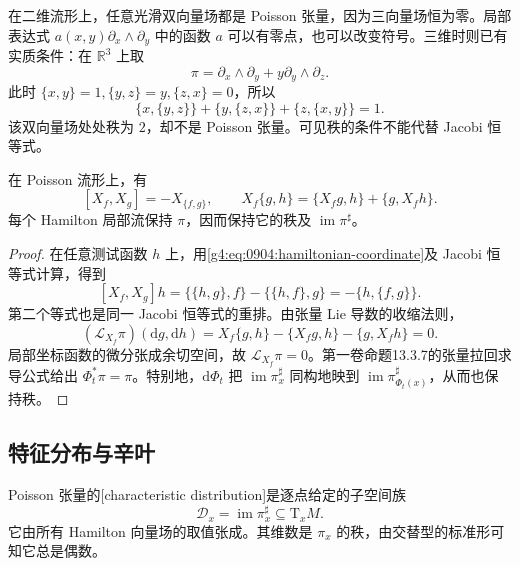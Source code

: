 \begin{example}\label{g4:exm:0904:jacobi-tests}
	在二维流形上，任意光滑双向量场都是 Poisson 张量，因为三向量场恒为零。局部表达式 \(a(x,y)\partial_x\wedge\partial_y\) 中的函数 \(a\) 可以有零点，也可以改变符号。三维时则已有实质条件：在 \(\mathbb R^3\) 上取
	\[
		\pi=\partial_x\wedge\partial_y+y\partial_y\wedge\partial_z.
	\]
	此时 \(\{x,y\}=1,\{y,z\}=y,\{z,x\}=0\)，所以
	\[
		\{x,\{y,z\}\}+\{y,\{z,x\}\}+\{z,\{x,y\}\}=1.
	\]
	该双向量场处处秩为 \(2\)，却不是 Poisson 张量。可见秩的条件不能代替 Jacobi 恒等式。
\end{example}

\begin{proposition}\label{g4:prop:0904:hamiltonian-invariance}
	在 Poisson 流形上，有
	\begin{equation}\label{g4:eq:0904:hamiltonian-identities}
		[X_f,X_g]=-X_{\{f,g\}},
		\qquad
		X_f\{g,h\}=\{X_f g,h\}+\{g,X_f h\}.
	\end{equation}
	每个 Hamilton 局部流保持 \(\pi\)，因而保持它的秩及 \(\operatorname{im}\pi^\sharp\)。
\end{proposition}

\begin{proof}
	在任意测试函数 \(h\) 上，用\eqref{g4:eq:0904:hamiltonian-coordinate}及 Jacobi 恒等式计算，得到
	\[
		[X_f,X_g]h
		=\{\{h,g\},f\}-\{\{h,f\},g\}
		=-\{h,\{f,g\}\}.
	\]
	第二个等式也是同一 Jacobi 恒等式的重排。由张量 Lie 导数的收缩法则，
	\[
		(\mathcal L_{X_f}\pi)(\mathrm{d}g,\mathrm{d}h)
		=X_f\{g,h\}-\{X_f g,h\}-\{g,X_f h\}=0.
	\]
	局部坐标函数的微分张成余切空间，故 \(\mathcal L_{X_f}\pi=0\)。第一卷命题13.3.7的张量拉回求导公式给出 \(\Phi_t^*\pi=\pi\)。特别地，\(\mathrm{d}\Phi_t\) 把 \(\operatorname{im}\pi_x^\sharp\) 同构地映到 \(\operatorname{im}\pi_{\Phi_t(x)}^\sharp\)，从而也保持秩。
\end{proof}

\subsection{特征分布与辛叶}
\label{g4:subsec:0904:02}
\begin{definition}\label{g4:def:0904:characteristic-distribution}
	Poisson 张量的[characteristic distribution]是逐点给定的子空间族
	\[
		\mathcal D_x=\operatorname{im}\pi_x^\sharp\subseteq\mathrm{T}_xM.
	\]
	它由所有 Hamilton 向量场的取值张成。其维数是 \(\pi_x\) 的秩，由交替型的标准形可知它总是偶数。
\end{definition}

